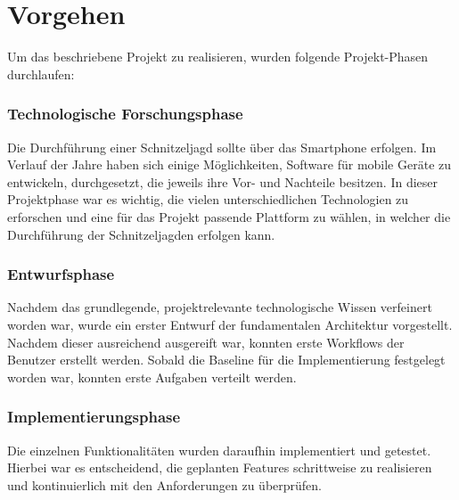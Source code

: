 \section{Vorgehen}

Um das beschriebene Projekt zu realisieren, wurden folgende Projekt-Phasen durchlaufen:

\subsubsection{Technologische Forschungsphase}

Die Durchführung einer Schnitzeljagd sollte über das Smartphone erfolgen. Im Verlauf der Jahre haben sich einige Möglichkeiten, Software für mobile Geräte zu entwickeln, durchgesetzt, die jeweils ihre Vor- und Nachteile besitzen. In dieser Projektphase war es wichtig, die vielen unterschiedlichen Technologien zu erforschen und eine für das Projekt passende Plattform zu wählen, in welcher die Durchführung der Schnitzeljagden erfolgen kann.

\subsubsection{Entwurfsphase}

Nachdem das grundlegende, projektrelevante technologische Wissen verfeinert worden war, wurde ein erster Entwurf der fundamentalen Architektur vorgestellt. Nachdem dieser ausreichend ausgereift war, konnten erste Workflows der Benutzer erstellt werden. Sobald die Baseline für die Implementierung festgelegt worden war, konnten erste Aufgaben verteilt werden.

\subsubsection{Implementierungsphase}

Die einzelnen Funktionalitäten wurden daraufhin implementiert und getestet. Hierbei war es entscheidend, die geplanten Features schrittweise zu realisieren und kontinuierlich mit den Anforderungen zu überprüfen.
